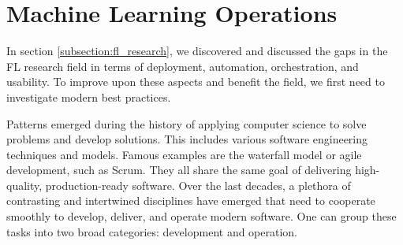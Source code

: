 
\section{Machine Learning Operations}

In section \ref{subsection:fl_research}, we discovered and discussed the gaps in the
FL research field in terms of deployment, automation, orchestration, and usability.
To improve upon these aspects and benefit the field,
we first need to investigate modern best practices.

Patterns emerged during the history of applying computer science to solve problems and develop solutions.
This includes various software engineering techniques and models.
Famous examples are the waterfall model or agile development, such as Scrum.
They all share the same goal of delivering high-quality, production-ready software.
Over the last decades, a plethora of contrasting and intertwined disciplines have emerged 
that need to cooperate smoothly to develop, deliver, and operate modern software.
One can group these tasks into two broad categories: development and operation.





